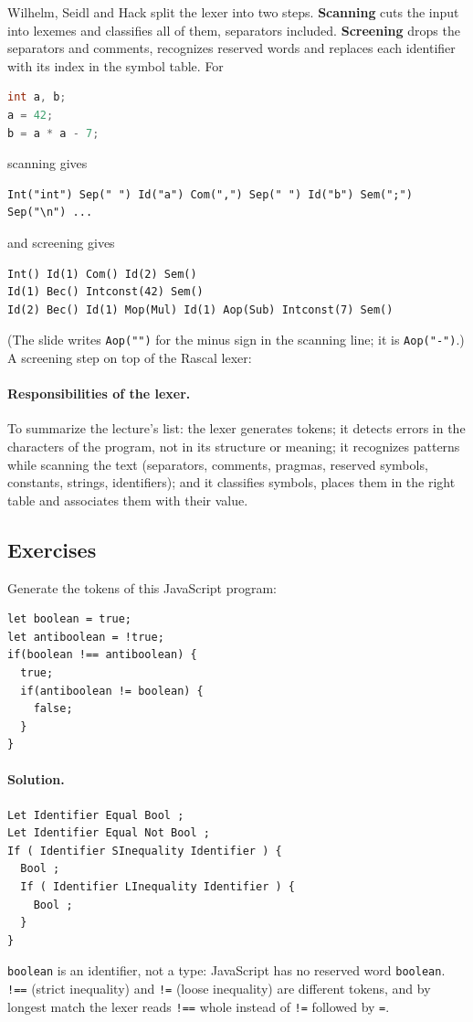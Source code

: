 Wilhelm, Seidl and Hack split the lexer into two steps. \textbf{Scanning} cuts
the input into lexemes and classifies all of them, separators included.
\textbf{Screening} drops the separators and comments, recognizes reserved
words and replaces each identifier with its index in the symbol table. For
\begin{lstlisting}[language=C]
int a, b;
a = 42;
b = a * a - 7;
\end{lstlisting}
scanning gives
\begin{lstlisting}
Int("int") Sep(" ") Id("a") Com(",") Sep(" ") Id("b") Sem(";") Sep("\n") ...
\end{lstlisting}
and screening gives
\begin{lstlisting}
Int() Id(1) Com() Id(2) Sem()
Id(1) Bec() Intconst(42) Sem()
Id(2) Bec() Id(1) Mop(Mul) Id(1) Aop(Sub) Intconst(7) Sem()
\end{lstlisting}
(The slide writes \texttt{Aop("")} for the minus sign in the scanning line;
it is \texttt{Aop("-")}.) A screening step on top of the Rascal lexer:

\paragraph{Responsibilities of the lexer.} To summarize the lecture's list: the
lexer generates tokens; it detects errors in the characters of the program,
not in its structure or meaning; it recognizes patterns while scanning the
text (separators, comments, pragmas, reserved symbols, constants, strings,
identifiers); and it classifies symbols, places them in the right table and
associates them with their value.

\subsection{Exercises}

\begin{exercise}
Generate the tokens of this JavaScript program:
\begin{lstlisting}
let boolean = true;
let antiboolean = !true;
if(boolean !== antiboolean) {
  true;
  if(antiboolean != boolean) {
    false;
  }
}
\end{lstlisting}
\end{exercise}

\paragraph{Solution.}
\begin{lstlisting}
Let Identifier Equal Bool ;
Let Identifier Equal Not Bool ;
If ( Identifier SInequality Identifier ) {
  Bool ;
  If ( Identifier LInequality Identifier ) {
    Bool ;
  }
}
\end{lstlisting}
\texttt{boolean} is an identifier, not a type: JavaScript has no reserved word
\texttt{boolean}. \texttt{!==} (strict inequality) and \texttt{!=} (loose
inequality) are different tokens, and by longest match the lexer reads
\texttt{!==} whole instead of \texttt{!=} followed by \texttt{=}.

